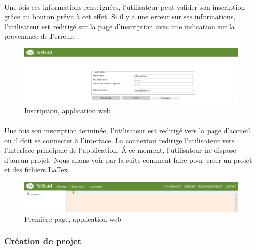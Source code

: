 \documentclass[a4paper,12pt]{article}
\begin{document}
\paragraph*{}
Une fois ces informations renseignées, l'utilisateur peut valider son inscription grâce au bouton prévu à cet effet. Si il y a une erreur sur ses informations, l'utilisateur est redirigé sur la page d'inscription avec une indication sur la provenance de l'erreur.

\begin{figure}[!ht]
\begin{center}
  \includegraphics[width=1\textwidth]{./images/screenshot/Inscription.png}
\end{center}
  \caption{Inscription, application web}
  \label{inscriptionWeb}
\end{figure}

\paragraph*{}
Une fois son inscription terminée, l'utilisateur est redirigé vers la page d'accueil ou il doit se connecter à l'interface. La connexion redirige l'utilisateur vers l'interface principale de l'application. \'A ce moment, l'utilisateur ne dispose d'aucun projet. Nous allons voir par la suite comment faire pour créer un projet et des fichiers LaTex.

\begin{figure}[!ht]
\begin{center}
  \includegraphics[width=1\textwidth]{./images/screenshot/PageEdition1.png}
\end{center}
  \caption{Première page, application web}
  \label{firstPageWeb}
\end{figure}

\clearpage
\subsubsection{Création de projet}
\end{document}
